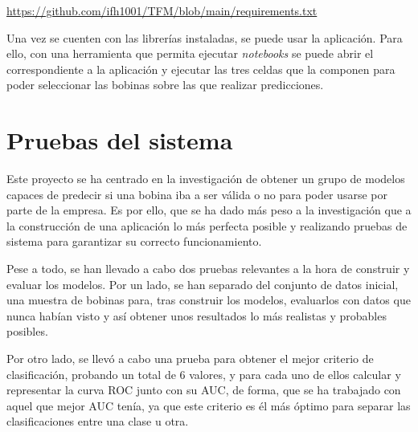 \url{https://github.com/ifh1001/TFM/blob/main/requirements.txt}

Una vez se cuenten con las librerías instaladas, se puede usar la aplicación. Para ello, con una herramienta que permita ejecutar \emph{notebooks} se puede abrir el correspondiente a la aplicación y ejecutar las tres celdas que la componen para poder seleccionar las bobinas sobre las que realizar predicciones.

\section{Pruebas del sistema}
Este proyecto se ha centrado en la investigación de obtener un grupo de modelos capaces de predecir si una bobina iba a ser válida o no para poder usarse por parte de la empresa. Es por ello, que se ha dado más peso a la investigación que a la construcción de una aplicación lo más perfecta posible y realizando pruebas de sistema para garantizar su correcto funcionamiento.

Pese a todo, se han llevado a cabo dos pruebas relevantes a la hora de construir y evaluar los modelos. Por un lado, se han separado del conjunto de datos inicial, una muestra de bobinas para, tras construir los modelos, evaluarlos con datos que nunca habían visto y así obtener unos resultados lo más realistas y probables posibles.

Por otro lado, se llevó a cabo una prueba para obtener el mejor criterio de clasificación, probando un total de 6 valores, y para cada uno de ellos calcular y representar la curva ROC junto con su AUC, de forma, que se ha trabajado con aquel que mejor AUC tenía, ya que este criterio es él más óptimo para separar las clasificaciones entre una clase u otra.